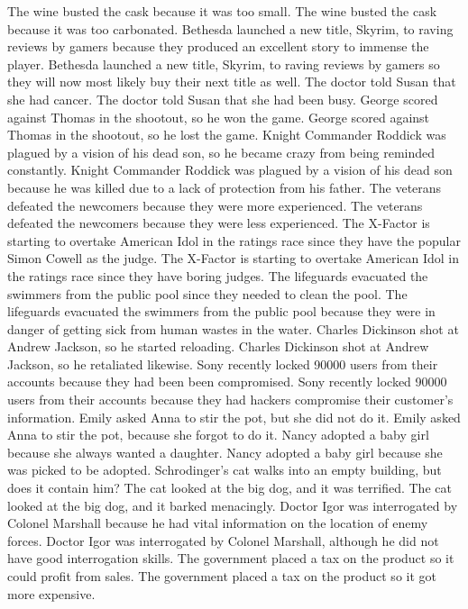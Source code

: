 \documentclass{article}
\begin{document}
\begin{enumerate}
	The wine busted the cask because it was too small.
	The wine busted the cask because it was too carbonated.
	Bethesda launched a new title, Skyrim, to raving reviews by gamers because they produced an excellent story to immense the player.
	Bethesda launched a new title, Skyrim, to raving reviews by gamers so they will now most likely buy their next title as well.
	The doctor told Susan that she had cancer.
	The doctor told Susan that she had been busy.
	George scored against Thomas in the shootout, so he won the game.
	George scored against Thomas in the shootout, so he lost the game.
	Knight Commander Roddick was plagued by a vision of his dead son, so he became crazy from being reminded constantly.
	Knight Commander Roddick was plagued by a vision of his dead son because he was killed due to a lack of protection from his father.
	The veterans defeated the newcomers because they were more experienced.
	The veterans defeated the newcomers because they were less experienced.
	The X-Factor is starting to overtake American Idol in the ratings race since they have the popular Simon Cowell as the judge.
	The X-Factor is starting to overtake American Idol in the ratings race since they have boring judges.
	The lifeguards evacuated the swimmers from the public pool since they needed to clean the pool.
	The lifeguards evacuated the swimmers from the public pool because they were in danger of getting sick from human wastes in the water.
	Charles Dickinson shot at Andrew Jackson, so he started reloading.
	Charles Dickinson shot at Andrew Jackson, so he retaliated likewise.
	Sony recently locked 90000 users from their accounts because they had been been compromised.
	Sony recently locked 90000 users from their accounts because they had hackers compromise their customer's information.
	Emily asked Anna to stir the pot, but she did not do it.
	Emily asked Anna to stir the pot, because she forgot to do it.
	Nancy adopted a baby girl because she always wanted a daughter.
	Nancy adopted a baby girl because she was picked to be adopted.
	Schrodinger's cat walks into an empty building, but does it contain him?
	The cat looked at the big dog, and it was terrified.
	The cat looked at the big dog, and it barked menacingly.
	Doctor Igor was interrogated by Colonel Marshall because he had vital information on the location of enemy forces.
	Doctor Igor was interrogated by Colonel Marshall, although he did not have good interrogation skills.
	The government placed a tax on the product so it could profit from sales.
	The government placed a tax on the product so it got more expensive.

\end{enumerate}
\end{document}
